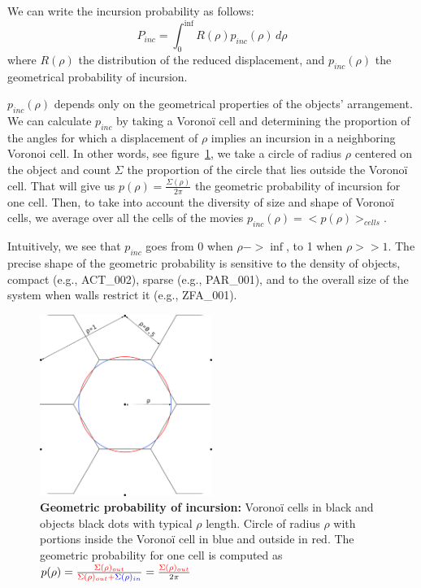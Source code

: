     We can write the incursion probability as follows:
        $$P_{inc}=\int_{0}^{\inf} R(\rho)p_{inc}(\rho) \,d \rho$$
    where $R(\rho)$ the distribution of the reduced displacement, and $p_{inc}(\rho)$ the geometrical probability of incursion.

    $p_{inc}(\rho)$ depends only on the geometrical properties of the objects' arrangement. We can calculate $p_{inc}$ by taking a Voronoï cell and determining the proportion of the angles for which a displacement of $\rho$ implies an incursion in a neighboring Voronoi cell. In other words, see figure~\ref{part_1:fig_pinc}, we take a circle of radius $\rho$ centered on the object and count $\Sigma$ the proportion of the circle that lies outside the Voronoï cell. That will give us $p(\rho)=\frac{\Sigma(\rho)}{2\pi}$ the geometric probability of incursion for one cell. Then, to take into account the diversity of size and shape of Voronoï cells, we average over all the cells of the movies $p_{inc}(\rho)=<p(\rho)>_{cells}$.

    Intuitively, we see that $p_{inc}$ goes from 0 when $\rho->\inf$, to 1 when $\rho>>1$. The precise shape of the geometric probability is sensitive to the density of objects, compact (e.g., ACT\_002), sparse (e.g., PAR\_001), and to the overall size of the system when walls restrict it (e.g., ZFA\_001).

	\begin{figure}[h]
    \centering
    \includegraphics[width=0.5\textwidth]{part_1/assets/Figure_pinc.png}
    \caption{\textbf{Geometric probability of incursion:} Voronoï cells in black and objects black dots with typical $\rho$ length. Circle of radius $\rho$ with portions inside the Voronoï cell in blue and outside in red. The geometric probability for one cell is computed as $p(\rho)=\frac{\color{red}{\Sigma(\rho)_{out}}}{\color{red}{\Sigma(\rho)_{out}} + \color{blue}{\Sigma(\rho)_{in}}} = \frac{\color{red}{\Sigma(\rho)_{out}}}{2\pi}$}
    \label{part_1:fig_pinc}
    \end{figure}

